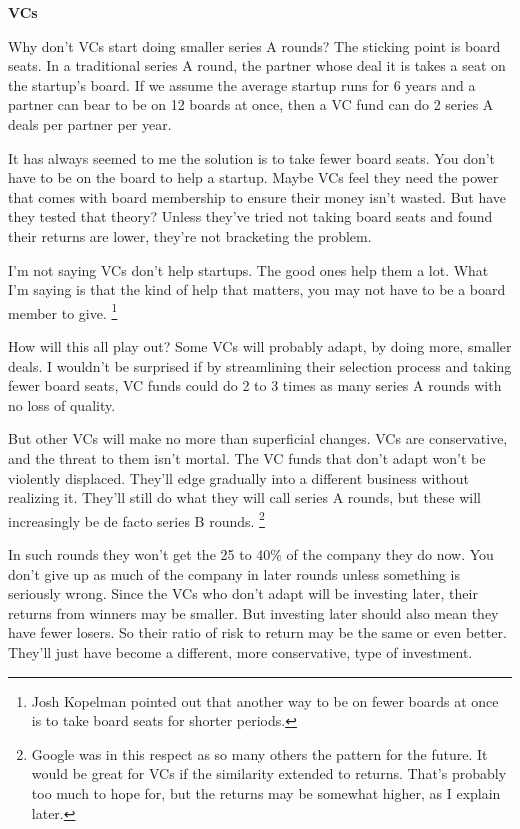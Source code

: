 \textbf{VCs}

Why don't VCs start doing smaller series A rounds? The sticking point is
board seats. In a traditional series A round, the partner whose deal it
is takes a seat on the startup's board. If we assume the average startup
runs for 6 years and a partner can bear to be on 12 boards at once, then
a VC fund can do 2 series A deals per partner per year.

It has always seemed to me the solution is to take fewer board seats.
You don't have to be on the board to help a startup. Maybe VCs feel they
need the power that comes with board membership to ensure their money
isn't wasted. But have they tested that theory? Unless they've tried not
taking board seats and found their returns are lower, they're not
bracketing the problem.

I'm not saying VCs don't help startups. The good ones help them a lot.
What I'm saying is that the kind of help that matters, you may not have
to be a board member to give. \footnote{Josh Kopelman pointed out that another way to be on fewer boards
at once is to take board seats for shorter periods.}

How will this all play out? Some VCs will probably adapt, by doing more,
smaller deals. I wouldn't be surprised if by streamlining their
selection process and taking fewer board seats, VC funds could do 2 to 3
times as many series A rounds with no loss of quality.

But other VCs will make no more than superficial changes. VCs are
conservative, and the threat to them isn't mortal. The VC funds that
don't adapt won't be violently displaced. They'll edge gradually into a
different business without realizing it. They'll still do what they will
call series A rounds, but these will increasingly be de facto series B
rounds. \footnote{Google was in this respect as so many others the pattern for the
future. It would be great for VCs if the similarity extended to returns.
That's probably too much to hope for, but the returns may be somewhat
higher, as I explain later.}

In such rounds they won't get the 25 to 40\% of the company they do now.
You don't give up as much of the company in later rounds unless
something is seriously wrong. Since the VCs who don't adapt will be
investing later, their returns from winners may be smaller. But
investing later should also mean they have fewer losers. So their ratio
of risk to return may be the same or even better. They'll just have
become a different, more conservative, type of investment.

